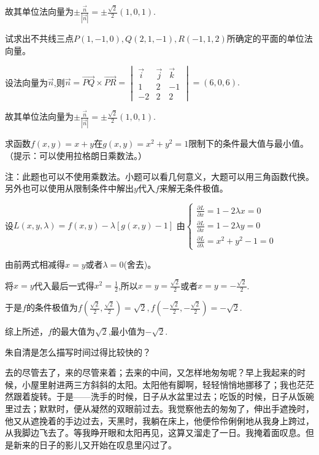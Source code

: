 \documentclass[addtable,answer,twoside,12pt]{hnuexam}
\begin{document}
\begin{questions}
\begin{solution}
		故其单位法向量为$\pm\frac{\vec{n}}{|\vec{n}|}=\pm\frac{\sqrt{2}}{2}(1,0,1).$
	\end{solution}

	\question
		试求出不共线三点$P(1,-1,0),Q(2,1,-1),R(-1,1,2)$所确定的平面的单位法向量。
		\begin{solution}
			设法向量为$\vec{n}$,则$\vec{n}=\vec{PQ}\times\vec{PR}=\begin{vmatrix}
					\vec{i} & \vec{j} & \vec{k} \\
					1       & 2       & -1      \\
					-2      & 2       & 2
				\end{vmatrix}=(6,0,6).$
	
			故其单位法向量为$\pm\frac{\vec{n}}{|\vec{n}|}=\pm\frac{\sqrt{2}}{2}(1,0,1).$
		\end{solution}
		\vspace*{\stretch{1}}
	\clearpage

	\question
	求函数$f(x,y)=x+y$在$g(x,y)=x^2+y^2=1$限制下的条件最大值与最小值。（提示：可以使用拉格朗日乘数法。）
	\begin{solution}
		注：此题也可以不使用乘数法。小题可以看几何意义，大题可以用三角函数代换。另外也可以使用从限制条件中解出$y$代入$f$来解无条件极值。

		设$L(x,y,\lambda)=f(x,y)-\lambda [g(x,y)-1]$
		由$\begin{cases}
				\frac{\partial L}{\partial x}=1-2\lambda x=0 \\
				\frac{\partial L}{\partial x}=1-2\lambda y=0 \\
				\frac{\partial L}{\partial \lambda}=x^2+y^2-1=0
			\end{cases}$\score{4}

		由前两式相减得$x=y$或者$\lambda=0$(舍去)。\score{5}

		将$x=y$代入最后一式得$x^2=\frac{1}{2}$,所以$x=y=\frac{\sqrt{2}}{2}$或者$x=y=-\frac{\sqrt{2}}{2}$.\score{7}

		于是$f$的条件极值为$f(\frac{\sqrt{2}}{2},\frac{\sqrt{2}}{2})=\sqrt{2},f(-\frac{\sqrt{2}}{2},-\frac{\sqrt{2}}{2})=-\sqrt{2}.$\score{9}

		综上所述，$f$的最大值为$\sqrt{2}$,最小值为$-\sqrt{2}.$\score{10}
	\end{solution}

	\question
		朱自清是怎么描写时间过得比较快的？
		\begin{solution}
			去的尽管去了，来的尽管来着；去来的中间，又怎样地匆匆呢？早上我起来的时候，小屋里射进两三方斜斜的太阳。太阳他有脚啊，轻轻悄悄地挪移了；我也茫茫然跟着旋转。于是——洗手的时候，日子从水盆里过去；吃饭的时候，日子从饭碗里过去；默默时，便从凝然的双眼前过去。我觉察他去的匆匆了，伸出手遮挽时，他又从遮挽着的手边过去，天黑时，我躺在床上，他便伶伶俐俐地从我身上跨过，从我脚边飞去了。等我睁开眼和太阳再见，这算又溜走了一日。我掩着面叹息。但是新来的日子的影儿又开始在叹息里闪过了。
			

\end{solution}
\end{questions}
\end{document}
